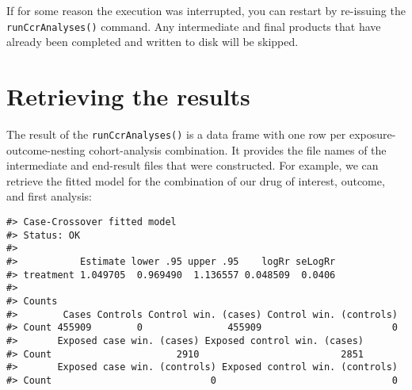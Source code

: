 \documentclass[]{article}
\newenvironment{Shaded}{\begin{snugshade}}{\end{snugshade}}
\newcommand{\DecValTok}[1]{\textcolor[rgb]{0.00,0.00,0.81}{#1}}
\newcommand{\KeywordTok}[1]{\textcolor[rgb]{0.13,0.29,0.53}{\textbf{#1}}}
\newcommand{\NormalTok}[1]{#1}
\newcommand{\OperatorTok}[1]{\textcolor[rgb]{0.81,0.36,0.00}{\textbf{#1}}}
\newcommand{\StringTok}[1]{\textcolor[rgb]{0.31,0.60,0.02}{#1}}
\begin{document}
If for some reason the execution was interrupted, you can restart by
re-issuing the \texttt{runCcrAnalyses()} command. Any intermediate and
final products that have already been completed and written to disk will
be skipped.

\hypertarget{retrieving-the-results}{%
\section{Retrieving the results}\label{retrieving-the-results}}

The result of the \texttt{runCcrAnalyses()} is a data frame with one row
per exposure-outcome-nesting cohort-analysis combination. It provides
the file names of the intermediate and end-result files that were
constructed. For example, we can retrieve the fitted model for the
combination of our drug of interest, outcome, and first analysis:

\begin{Shaded}
\end{Shaded}

\begin{verbatim}
#> Case-Crossover fitted model
#> Status: OK
#> 
#>           Estimate lower .95 upper .95    logRr seLogRr
#> treatment 1.049705  0.969490  1.136557 0.048509  0.0406
#> 
#> Counts
#>        Cases Controls Control win. (cases) Control win. (controls)
#> Count 455909        0               455909                       0
#>       Exposed case win. (cases) Exposed control win. (cases)
#> Count                      2910                         2851
#>       Exposed case win. (controls) Exposed control win. (controls)
#> Count                            0                               0
\end{verbatim}
\end{document}

